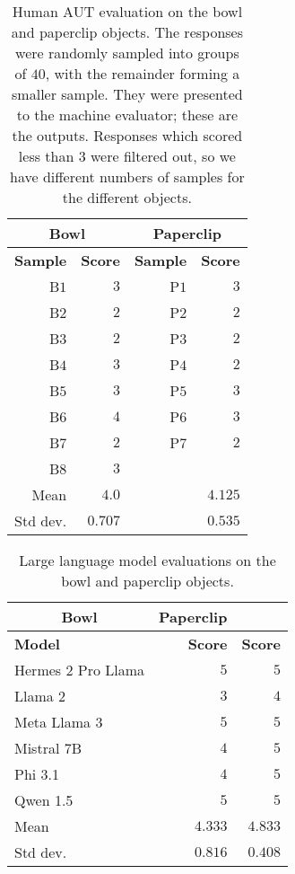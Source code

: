 \documentclass{article}
\begin{document}
\begin{table}
\centering
\begin{tabular}{rrrr}
\multicolumn{2}{c}{Bowl} & \multicolumn{2}{c}{Paperclip} \\
\toprule
\textbf{Sample} & \textbf{Score} & \textbf{Sample} & \textbf{Score} \\
\toprule
B$1$ & $3$ & P$1$ & $3$ \\
B$2$ & $2$ & P$2$ & $2$ \\
B$3$ & $2$ & P$3$ & $2$ \\
B$4$ & $3$ & P$4$ & $2$ \\
B$5$ & $3$ & P$5$ & $3$ \\
B$6$ & $4$ & P$6$ & $3$ \\
B$7$ & $2$ & P$7$ & $2$ \\ 
B$8$ & $3$ &  & \\
\midrule
Mean & $4.0$ & & $4.125$ \\
Std dev. & $0.707$ & & $0.535$ \\
\bottomrule
\end{tabular}
\vspace{2mm}
\caption{Human AUT evaluation on the bowl and paperclip objects. The responses were randomly sampled into groups of $40$, with the remainder forming a smaller sample. They were presented to the machine evaluator; these are the outputs. Responses which scored less than $3$ were filtered out, so we have different numbers of samples for the different objects.}
\label{sec_results:human_results}
\end{table}

\begin{table}
\centering
\begin{tabular}{lrr}
\multicolumn{1}{c}{Bowl} & \multicolumn{1}{c}{Paperclip} \\
\toprule
\textbf{Model} & \textbf{Score} & \textbf{Score} \\
\toprule
Hermes 2 Pro Llama & $5$ & $5$ \\
Llama 2 & $3$ & $4$ \\
Meta Llama 3 & $5$ & $5$ \\
Mistral 7B & $4$ & $5$ \\
Phi 3.1 & $4$ & $5$ \\
Qwen 1.5 & $5$ & $5$ \\
\midrule
Mean & $4.333$ & $4.833$ \\
Std dev. & $0.816$  & $0.408$ \\
\bottomrule
\end{tabular}
\vspace{2mm}
\caption{Large language model evaluations on the bowl and paperclip objects.}
\label{sec_results:model_results}
\end{table}
\end{document}
